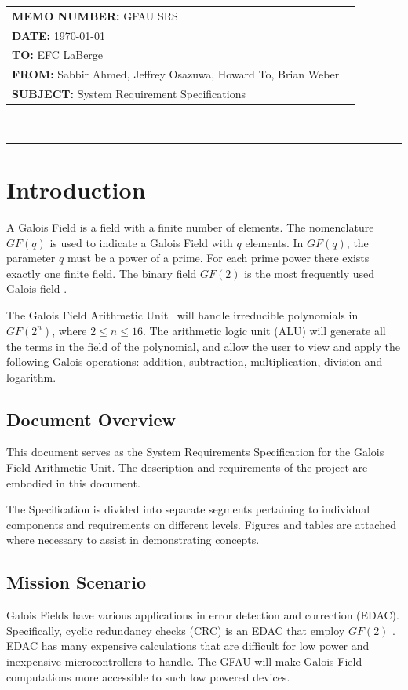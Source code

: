 \documentclass[12pt]{extarticle}
\newcommand{\team}{Galois Field Arithmetic Unit}
\newcommand{\Sabbir}{Sabbir Ahmed}
\newcommand{\Jeffrey}{Jeffrey Osazuwa}
\newcommand{\Howard}{Howard To}
\newcommand{\Brian}{Brian Weber}
\newcommand{\documentinfo}[5]{
    \begin{centering}
        \parbox{2in}{
        \begin{spacing}{1}
            \begin{flushleft}
                \begin{tabular}{l l} #1 \\ #2 \\ #3 \\ #4 \\ #5 \\
                \end{tabular}\\
                \rule{\textwidth}{1pt}
            \end{flushleft}
        \end{spacing} }
    \end{centering} }
\begin{document}
    \documentinfo {\textbf{MEMO NUMBER:} GFAU SRS} {\textbf{DATE:} \today}
    {\textbf{TO: } EFC LaBerge} {\textbf{FROM: }\Sabbir, \Jeffrey, \Howard,
    \Brian} {\textbf{SUBJECT: } System Requirement Specifications}
    \vspace{-0.1in}

    \section{Introduction} A Galois Field is a field with a finite number of
    elements. The nomenclature $GF(q)$ is used to indicate a Galois Field with
    $q$ elements. In $GF(q)$, the parameter $q$ must be a power of a prime. For
    each prime power there exists exactly one finite field. The binary field
    $GF(2)$ is the most frequently used Galois field \cite{wolfdef}.

    The \team~ will handle irreducible polynomials in $GF(2^n)$, where $2 \leq
    n \leq 16$. The arithmetic logic unit (ALU) will generate all the terms in
    the field of the polynomial, and allow the user to view and apply the
    following Galois operations: addition, subtraction, multiplication,
    division and logarithm.

        \subsection{Document Overview} This document serves as the System
        Requirements Specification for the Galois Field Arithmetic Unit. The
        description and requirements of the project are embodied in this
        document.

        The Specification is divided into separate segments pertaining to
        individual components and requirements on different levels. Figures and
        tables are attached where necessary to assist in demonstrating
        concepts.

        \subsection{Mission Scenario} Galois Fields have various applications
        in error detection and correction (EDAC). Specifically, cyclic
        redundancy checks (CRC) is an EDAC that employ $GF(2)$ \cite{crc}.
        EDAC has many expensive calculations that are difficult for low power
        and inexpensive microcontrollers to handle. The GFAU will make Galois
        Field computations more accessible to such low powered devices.
        \newpage
\end{document}
